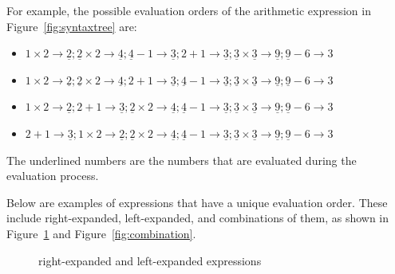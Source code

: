 \documentclass{article}
\numberwithin{definition}{section}
\numberwithin{lemma}{section}
\numberwithin{proposition}{section}
\numberwithin{corollary}{section}
\numberwithin{theorem}{section}
\begin{document}
For example, the possible evaluation orders of the arithmetic expression in Figure~\ref{fig:syntaxtree} are:
\begin{itemize}
    \item $1 \times 2 \rightarrow \underline{2}; \underline{2} \times 2 \rightarrow \underline{4}; \underline{4} - 1 \rightarrow \underline{3}; 2 + 1 \rightarrow \underline{3}; \underline{3} \times \underline{3} \rightarrow \underline{9}; \underline{9} - 6 \rightarrow 3$
    \item $1 \times 2 \rightarrow \underline{2}; \underline{2} \times 2 \rightarrow \underline{4}; 2 + 1 \rightarrow \underline{3}; \underline{4} - 1 \rightarrow \underline{3}; \underline{3} \times \underline{3} \rightarrow \underline{9}; \underline{9} - 6 \rightarrow 3$
    \item $1 \times 2 \rightarrow \underline{2}; 2 + 1 \rightarrow \underline{3}; \underline{2} \times 2 \rightarrow \underline{4}; \underline{4} - 1 \rightarrow \underline{3}; \underline{3} \times \underline{3} \rightarrow \underline{9}; \underline{9} - 6 \rightarrow 3$
    \item $2 + 1 \rightarrow \underline{3}; 1 \times 2 \rightarrow \underline{2}; \underline{2} \times 2 \rightarrow \underline{4}; \underline{4} - 1 \rightarrow \underline{3}; \underline{3} \times \underline{3} \rightarrow \underline{9}; \underline{9} - 6 \rightarrow 3$
\end{itemize}

The underlined numbers are the numbers that are evaluated during the evaluation process.

Below are examples of expressions that have a unique evaluation order.
These include right-expanded, left-expanded,
and combinations of them, as shown in Figure~\ref{fig:leftright} and Figure~\ref{fig:combination}.

\begin{figure}[ht]
    \centering
    \caption{right-expanded and left-expanded expressions}\label{fig:leftright}
\end{figure}
\end{document}
